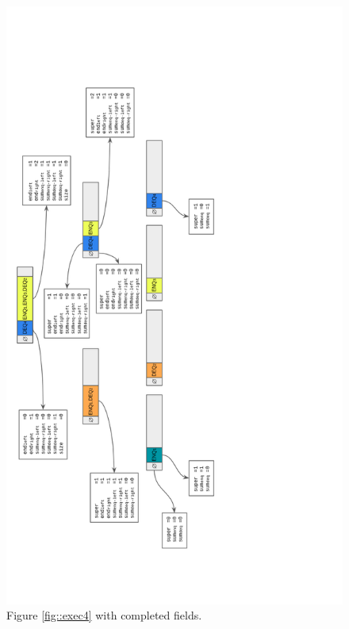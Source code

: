 \documentclass[10pt]{article}
\theoremstyle{definition}
\begin{document}
\begin{figure}
  \center\includegraphics[width=4.8in]{thesis/pics/exec5.png}
  \caption{Figure \ref{fig::exec4} with completed fields. \label{fig::exec5}}
\end{figure}

\pagebreak

 

\end{document}
